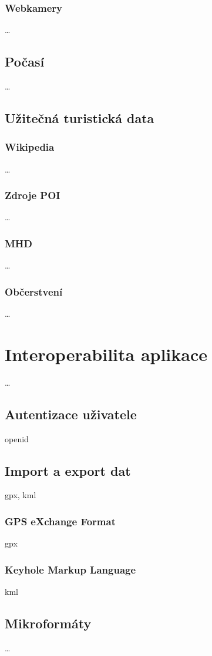 \subsection{Webkamery}
\ldots

\section{Počasí}
\ldots

\section{Užitečná turistická data}
\subsection{Wikipedia}
\ldots
\subsection{Zdroje POI}
\ldots
\subsection{MHD}
\ldots
\subsection{Občerstvení}
\ldots

\chapter{Interoperabilita aplikace}
\ldots

\section{Autentizace uživatele}
openid

\section{Import a export dat}
gpx, kml
\subsection{GPS eXchange Format}
gpx
\subsection{Keyhole Markup Language}
kml

\section{Mikroformáty}
\ldots

